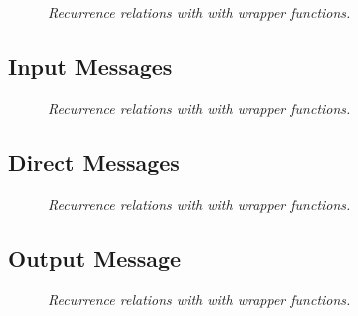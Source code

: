 \documentclass{article}
\begin{document}



\begin{figure}[H]
	\centering
	
	\caption{\it Recurrence relations with with wrapper functions.}
	\label{fig:RRhc}
\end{figure} 



\subsection{Input Messages}

\begin{figure}[H]
	\centering
	
	\caption{\it Recurrence relations with with wrapper functions.}
	\label{fig:RRim}
\end{figure} 


\subsection{Direct Messages}

\begin{figure}[H]
	\centering
	
	\caption{\it Recurrence relations with with wrapper functions.}
	\label{fig:RRdm}
\end{figure} 


\subsection{Output Message}


\begin{figure}[H]
	\centering
	
	\caption{\it Recurrence relations with with wrapper functions.}
	\label{fig:RRom}
\end{figure} 
\end{document}
